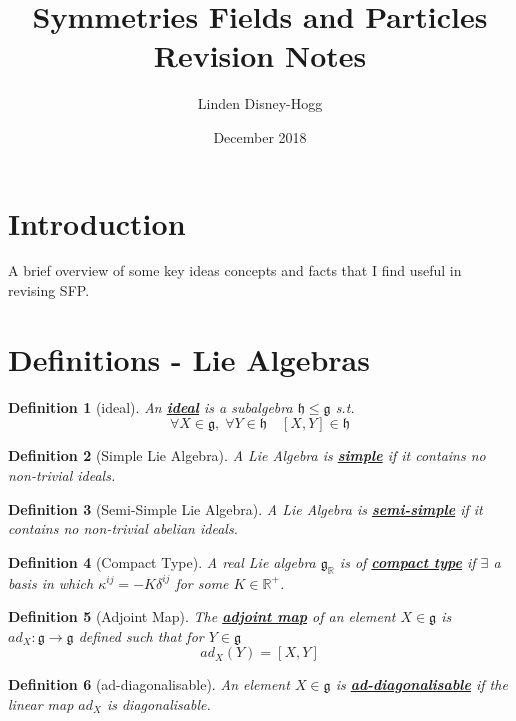 \documentclass{article}
\title{Symmetries Fields and Particles Revision Notes}
\author{Linden Disney-Hogg}
\date{December 2018}
\newtheorem{definition}{Definition}[section]
\newcommand{\bam}[1]{\underline{\bf{#1}}}
\newcommand{\mf}[1]{\mathfrak{#1}}
\newcommand{\comm}[2][]{\left[ #1, #2 \right]}
\begin{document}
\maketitle
\tableofcontents

\section{Introduction}
A brief overview of some key ideas concepts and facts that I find useful in revising SFP. 


\section{Definitions - Lie Algebras}

\begin{definition}[ideal]
An \bam{ideal} is a subalgebra $\mf{h} \leq \mf{g}$ s.t.
\[
\forall X\in\mf{g}, \; \forall Y\in\mf{h} \quad  \comm[X]{Y}\in\mf{h}
\]
\end{definition}

\begin{definition}[Simple Lie Algebra]
A Lie Algebra is \bam{simple} if it contains no non-trivial ideals.
\end{definition}

\begin{definition}[Semi-Simple Lie Algebra]
A Lie Algebra is \bam{semi-simple} if it contains no non-trivial abelian ideals. 
\end{definition}

\begin{definition}[Compact Type]
A real Lie algebra $\mf{g}_\mathbb{R}$ is of \bam{compact type} if $\exists$ a basis in which $\kappa^{ij}=-K\delta^{ij}$ for some $K\in\mathbb{R}^{+}$.
\end{definition}

\begin{definition}[Adjoint Map]
The \bam{adjoint map} of an element $X\in\mf{g}$ is $ad_{X}:\mf{g}\to\mf{g}$ defined such that for $Y\in\mf{g}$
\[
ad_{X}\left(Y\right)=\comm[X]{Y}
\]
\end{definition}

\begin{definition}[ad-diagonalisable]
An element $X\in\mf{g}$ is \bam{ad-diagonalisable} if the linear map $ad_X$ is diagonalisable. 
\end{definition}
\end{document}
